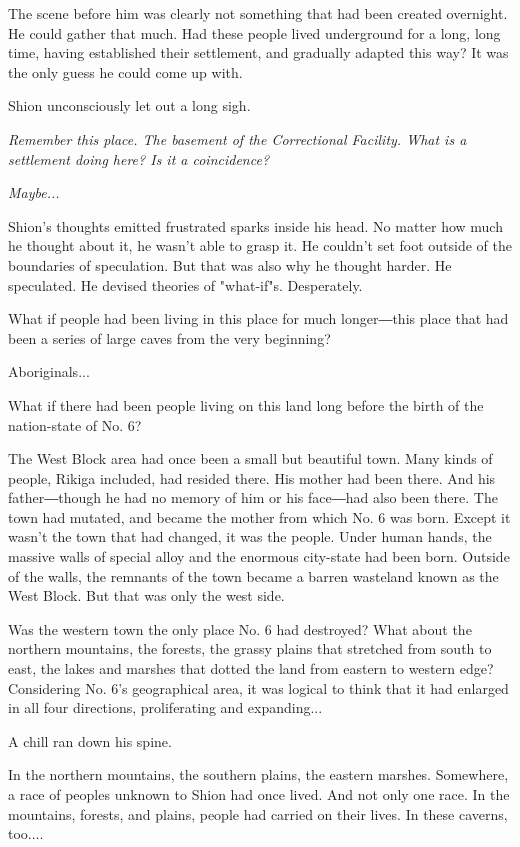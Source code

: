 The scene before him was clearly not something that had been created
overnight. He could gather that much. Had these people lived underground
for a long, long time, having established their settlement, and
gradually adapted this way? It was the only guess he could come up with.

Shion unconsciously let out a long sigh.

\emph{Remember this place. The basement of the Correctional Facility. What is
	a settlement doing here? Is it a coincidence?}

\emph{Maybe...}

Shion's thoughts emitted frustrated sparks inside his head. No matter
how much he thought about it, he wasn't able to grasp it. He couldn't
set foot outside of the boundaries of speculation. But that was also why
he thought harder. He speculated. He devised theories of "what-if"s.
Desperately.

What if people had been living in this place for much longer―this place
that had been a series of large caves from the very beginning?

Aboriginals...

What if there had been people living on this land long before the birth
of the nation-state of No. 6?

The West Block area had once been a small but beautiful town. Many kinds
of people, Rikiga included, had resided there. His mother had been
there. And his father―though he had no memory of him or his face―had
also been there. The town had mutated, and became the mother from which
No. 6 was born. Except it wasn't the town that had changed, it was the
people. Under human hands, the massive walls of special alloy and the
enormous city-state had been born. Outside of the walls, the remnants of
the town became a barren wasteland known as the West Block. But that was
only the west side.

Was the western town the only place No. 6 had destroyed? What about the
northern mountains, the forests, the grassy plains that stretched from
south to east, the lakes and marshes that dotted the land from eastern
to western edge? Considering No. 6's geographical area, it was logical
to think that it had enlarged in all four directions, proliferating and
expanding...

A chill ran down his spine.

In the northern mountains, the southern plains, the eastern marshes.
Somewhere, a race of peoples unknown to Shion had once lived. And not
only one race. In the mountains, forests, and plains, people had carried
on their lives. In these caverns, too....

